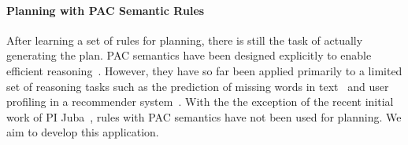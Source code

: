 \documentclass[12pt]{article}
\newcommand{\note}[1]{\textbf{\textit{#1}}}
\begin{document}




\paragraph{Planning with PAC Semantic Rules}


After learning a set of rules for planning, there is still the task of actually generating the plan. PAC semantics have been designed explicitly to enable efficient reasoning~\cite{valiant2000robustLogics}. However, they have so far been applied primarily to a limited set of reasoning tasks such as the prediction of missing words in text~\cite{michael2008first} and user profiling in a recommender system~\cite{semeraro2009knowledge}. With the the exception of the recent initial work of PI Juba~\cite{juba2016jmlr}, rules with PAC semantics have not been used for planning. We aim to develop this application. 

\end{document}
